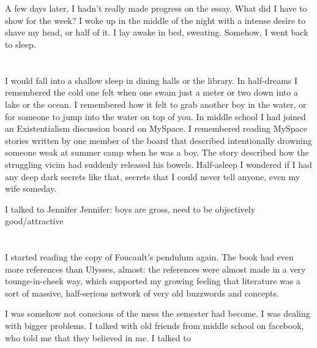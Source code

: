 \section{} 


\section{}

A few days later, I hadn't really made progress on the essay.  What did I have
to show for the week? I woke up in the middle of the night with a intense desire
to shave my head, or half of it.  I lay awake in bed, sweating.  Somehow, I went
back to sleep.

\section{}

I would fall into a shallow sleep in dining halls or the library.  In
half-dreams I remembered the cold one felt when one swam just a meter or two
down into a lake or the ocean.  I remembered how it felt to grab another boy in
the water, or for someone to jump into the water on top of you.  In middle
school I had joined an Existentialism discussion board on MySpace.  I remembered
reading MySpace stories written by one member of the board that described
intentionally drowning someone weak at summer camp when he was a boy.  The story
described how the struggling vicim had suddenly released his bowels.
Half-asleep I wondered if I had any deep dark secrets like that, secrets that I
could never tell anyone, even my wife someday.

I talked to Jennifer
Jennifer: boys are gross, need to be objectively good/attractive

\section{}

I started reading the copy of Foucault's pendulum again.  The book had even
more references than Ulysses, almost: the references were almost made in a very
tounge-in-cheek way, which supported my growing feeling that literature was a
sort of massive, half-serious network of very old buzzwords and concepts.

I was somehow not conscious of the mess the semester had become.  I was dealing
with bigger problems.  I talked with old friends from middle school on facebook,
who told me that they believed in me.  I talked to 

